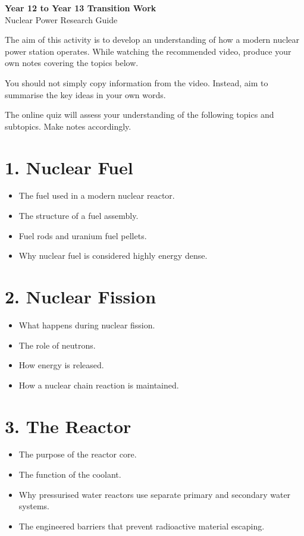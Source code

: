 \documentclass[11pt,a4paper]{article}
\begin{document}
\begin{center}
    {\LARGE\textbf{Year 12 to Year 13 Transition Work}}\\[0.5em]
    {\Large Nuclear Power Research Guide}
\end{center}

The aim of this activity is to develop an understanding of how a modern nuclear power station operates. While watching the recommended video, produce your own notes covering the topics below.

You should not simply copy information from the video. Instead, aim to summarise the key ideas in your own words.

The online quiz will assess your understanding of the following topics and subtopics.  Make notes accordingly.

\bigskip

\section*{1. Nuclear Fuel}

\begin{itemize}[leftmargin=*]
    \item The fuel used in a modern nuclear reactor.
    \item The structure of a fuel assembly.
    \item Fuel rods and uranium fuel pellets.
    \item Why nuclear fuel is considered highly energy dense.
\end{itemize}

\section*{2. Nuclear Fission}

\begin{itemize}[leftmargin=*]
    \item What happens during nuclear fission.
    \item The role of neutrons.
    \item How energy is released.
    \item How a nuclear chain reaction is maintained.
\end{itemize}

\section*{3. The Reactor}

\begin{itemize}[leftmargin=*]
    \item The purpose of the reactor core.
    \item The function of the coolant.
    \item Why pressurised water reactors use separate primary and secondary water systems.
    \item The engineered barriers that prevent radioactive material escaping.
\end{itemize}
\end{document}
